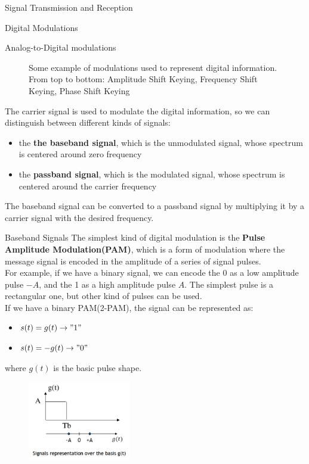 \begin{section}{Signal Transmission and Reception}
\begin{subsection}{Digital Modulations}
\begin{subsubsection}{Analog-to-Digital modulations}
\begin{figure}[h]
        \caption{Some example of modulations used to represent digital information. From top to bottom:
          Amplitude Shift Keying, Frequency Shift Keying, Phase Shift Keying}
        \label{fig:DigitalModulation}
      \end{figure}
      The carrier signal is used to modulate the digital information, so we can distinguish between
      different kinds of signals:
      \begin{itemize}
        \item the \textbf{the baseband signal}, which is the unmodulated signal, whose spectrum is
          centered around zero frequency
        \item the \textbf{passband signal}, which is the modulated signal, whose spectrum is centered
          around the carrier frequency
      \end{itemize}
      The baseband signal can be converted to a passband signal by multiplying it by a carrier signal
      with the desired frequency.\\
    \end{subsubsection}
    \begin{subsubsection}{Baseband Signals}
      The simplest kind of digital modulation is the \textbf{Pulse Amplitude Modulation(PAM)}, which
      is a form of modulation where the message signal is encoded in the amplitude of a series of
      signal pulses.\\
      For example, if we have a binary signal, we can encode the 0 as a low amplitude pulse $-A$, and the
      1 as a high amplitude pulse $A$. The simplest pulse is a rectangular one, but other kind of 
      pulses can be used.\\
      If we have a binary PAM(2-PAM), the signal can be represented as:
      \begin{itemize}
        \item $s(t)=g(t) \to "1"$
        \item $s(t)=-g(t) \to "0"$
      \end{itemize}
      where $g(t)$ is the basic pulse shape.\\
      \begin{figure}[h]
        \centering
        \includegraphics[width=0.4\textwidth]{img/2-PAM.png}

\end{figure}
\end{subsubsection}
\end{subsection}
\end{section}
